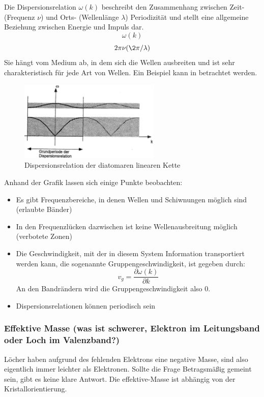 Die Dispersionsrelation $\omega(k)$ beschreibt den Zusammenhang zwischen Zeit- (Frequenz $\nu$) und
Orts- (Wellenl\"ange $\lambda$) Periodizit\"at und stellt eine allgemeine Beziehung zwischen Energie
und Impuls dar.
\begin{equation}
    \omega(k)
\end{equation}
\begin{equation}
    2\pi \nu(\2\pi/\lambda)
\end{equation}
Sie h\"angt vom Medium ab, in dem sich die Wellen ausbreiten und ist sehr charakteristisch für jede
Art von Wellen.
Ein Beispiel kann in  betrachtet werden.

\begin{figure}
    \centering
    \includegraphics[width=0.6\textwidth]{fig/dispersionsrelation}
    \caption{Dispersionsrelation der diatomaren linearen Kette}
    \label{fig:dispersionsrelation}
\end{figure}

Anhand der Grafik lassen sich einige Punkte beobachten:
\begin{itemize}
    \item Es gibt Frequenzbereiche, in denen Wellen und Schiwnungen möglich sind (erlaubte Bänder)
    \item In den Frequenzlücken dazwischen ist keine Wellenausbreitung möglich (verbotete Zonen)
    \item Die Geschwindigkeit, mit der in diesem System Information transportiert werden kann, die
    sogenannte Gruppengeschwindigkeit, ist gegeben durch:
    \begin{equation}
        v_g=\frac{\partial \omega(k)}{\partial k}
    \end{equation}
    An den Bandrändern wird die Gruppengeschwindigkeit also $0$.
    \item Dispersionsrelationen können periodisch sein
\end{itemize}

\subsubsection{Effektive Masse (was ist schwerer, Elektron im Leitungsband oder Loch im Valenzband?)}
L\"ocher haben aufgrund des fehlenden Elektrons eine negative Masse, sind also eigentlich immer leichter als Elektronen.
Sollte die Frage Betragsmäßig gemeint sein, gibt es keine klare Antwort. Die effektive-Masse ist abhängig von der Kristallorientierung.


